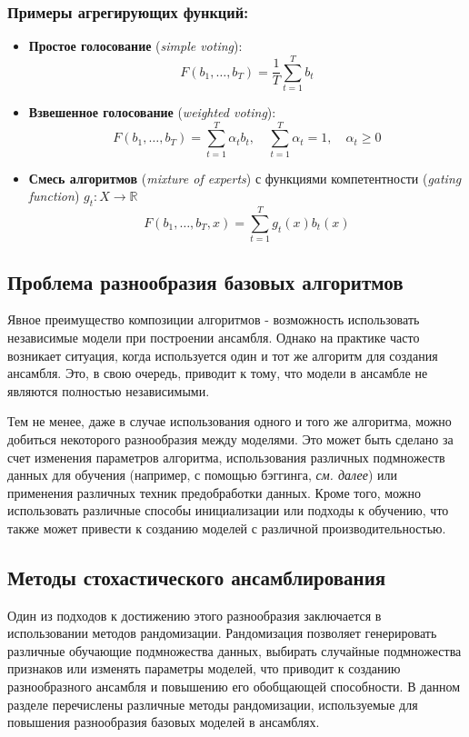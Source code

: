\subsubsection*{Примеры агрегирующих функций:}
\begin{itemize}
    \item \textbf{Простое голосование} (\textit{simple voting}):
          $$F(b_1, \dots , b_T) = \frac{1}{T} \sum_{t=1}^T b_t$$
    \item \textbf{Взвешенное голосование} (\textit{weighted voting}):
          $$F(b_1, \dots, b_T) = \sum_{t=1}^T \alpha_t b_t, \quad \sum_{t=1}^T \alpha_t = 1, \quad \alpha_t \ge 0$$
    \item \textbf{Смесь алгоритмов} (\textit{mixture of experts}) с функциями компетентности (\textit{gating function}) $g_t: X \to \mathbb{R}$
          $$F(b_1, \dots, b_T, x) = \sum_{t=1}^T g_t(x) b_t(x)$$
\end{itemize}
\subsection{Проблема разнообразия базовых алгоритмов}
Явное преимущество композиции алгоритмов - возможность использовать независимые модели при построении ансамбля. Однако на практике  часто возникает ситуация, когда используется один и тот же алгоритм для создания ансамбля. Это, в свою очередь, приводит к тому, что модели в ансамбле не являются полностью независимыми.

Тем не менее, даже в случае использования одного и того же алгоритма, можно добиться некоторого разнообразия между моделями. Это может быть сделано за счет изменения параметров алгоритма, использования различных подмножеств данных для обучения (например, с помощью бэггинга, \textit{см. далее}) или применения различных техник предобработки данных. Кроме того, можно использовать различные способы инициализации или подходы к обучению, что также может привести к созданию моделей с различной производительностью.

\subsection{Методы стохастического ансамблирования} %
Один из подходов к достижению этого разнообразия заключается в использовании методов рандомизации. Рандомизация позволяет генерировать различные обучающие подмножества данных, выбирать случайные подмножества признаков или изменять параметры моделей, что приводит к созданию разнообразного ансамбля и повышению его обобщающей способности. В данном разделе перечислены различные методы рандомизации, используемые для повышения разнообразия базовых моделей в ансамблях.

